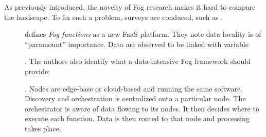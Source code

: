 \documentclass[11pt]{sdm}
\begin{document}
As previously introduced, the novelty of Fog research makes it hard to compare the landscape. To fix such a problem, surveys are conduced, such as . 


\begin{description}
	\item[\citet{cheng_fog_2019}] defines \textit{Fog functions} as a new \gls{FaaS} platform. They note data locality is of ``paramount'' importance. Data are observed to be linked with variable
	. The authors also identify what a data-intensive Fog framework should provide: 
	.
	Nodes are edge-base or cloud-based and running the same software. Discovery and orchestration is centralized onto a particular node. The orchestrator is aware of data flowing to its nodes. It then decides where to execute each function. Data is then routed to that node and processing takes place.
	

\end{description}
\end{document}
